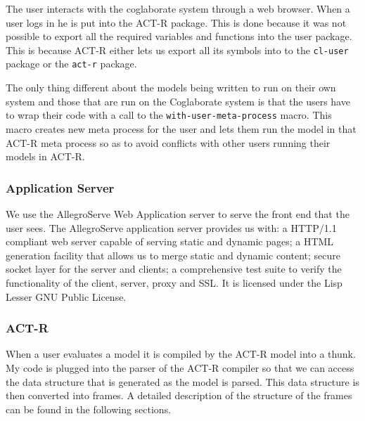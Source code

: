 The user interacts with the coglaborate system through a web
browser. When a user logs in he is put into the ACT-R package. This is
done because it was not possible to export all the required variables
and functions into the user package. This is because ACT-R either lets
us export all its symbols into to the \texttt{cl-user} package or the
\texttt{act-r} package.

The only thing different about the models being written to run on
their own system and those that are run on the Coglaborate system is
that the users have to wrap their code with a call to the
\texttt{with-user-meta-process} macro. This macro creates new meta
process for the user and lets them run the model in that ACT-R meta
process so as to avoid conflicts with other users running their models
in ACT-R.

\subsubsection{Application Server}

We use the AllegroServe Web Application server to serve the front end
that the user sees. The AllegroServe\cite{aserve2009} application server provides us
with: a HTTP/1.1 compliant web server capable of serving static and
dynamic pages; a HTML generation facility that allows us to merge
static and dynamic content; secure socket layer for the server and
clients; a comprehensive test suite to verify the functionality of the
client, server, proxy and SSL. It is licensed under the Lisp Lesser
GNU Public License. 



\subsubsection{ACT-R}

When a user evaluates a model it is compiled by the ACT-R model into a
thunk. My code is plugged into the parser of the ACT-R compiler so
that we can access the data structure that is generated as the model
is parsed. This data structure is then converted into frames. A
detailed description of the structure of the frames can be found in
the following sections.




